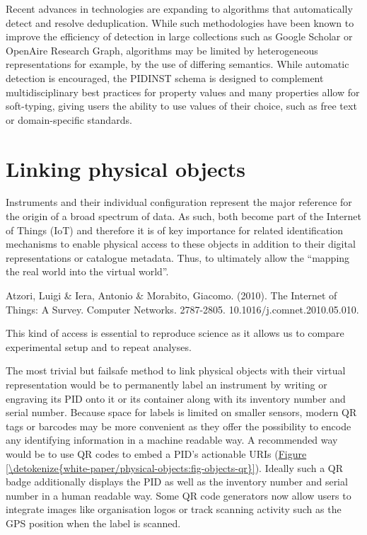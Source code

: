 \documentclass[a4paper,10pt,english]{sphinxmanual}
\begin{document}
Recent advances in technologies are expanding to algorithms that
automatically detect and resolve deduplication. While such methodologies
have been known to improve the efficiency of detection in large
collections such as Google Scholar or OpenAire Research Graph,
algorithms may be limited by heterogeneous representations for example,
by the use of differing semantics. While automatic detection is
encouraged, the PIDINST schema is designed to complement
multidisciplinary best practices for property values and many properties
allow for soft-typing, giving users the ability to use values of their
choice, such as free text or domain-specific standards.


\section{Linking physical objects}
\label{\detokenize{white-paper/physical-objects:linking-physical-objects}}\label{\detokenize{white-paper/physical-objects::doc}}
Instruments and their individual configuration represent the major
reference for the origin of a broad spectrum of data. As such, both
become part of the Internet of Things (IoT) and therefore it is of key
importance for related identification mechanisms to enable physical
access to these objects in addition to their digital representations or
catalogue metadata. Thus, to ultimately allow the “mapping the real
world into the virtual world”.%
\begin{footnote}[1]\sphinxAtStartFootnote
Atzori, Luigi \& Iera, Antonio \& Morabito, Giacomo. (2010). The
Internet of Things: A Survey. Computer Networks. 2787-2805.
10.1016/j.comnet.2010.05.010.
%
\end{footnote} This kind of access is
essential to reproduce science as it allows us to compare experimental
setup and to repeat analyses.

The most trivial but failsafe method to link physical objects with their
virtual representation would be to permanently label an instrument by
writing or engraving its PID onto it or its container along with its
inventory number and serial number. Because space for labels is limited
on smaller sensors, modern QR tags or barcodes may be more convenient as
they offer the possibility to encode any identifying information in a
machine readable way. A recommended way would be to use QR codes to
embed a PID’s actionable URIs (\hyperref[\detokenize{white-paper/physical-objects:fig-objects-qr}]{Figure \ref{\detokenize{white-paper/physical-objects:fig-objects-qr}}}). Ideally such
a QR badge additionally displays the PID as well as the inventory
number and serial number in a human readable way. Some QR code
generators now allow users to integrate images like organisation logos
or track scanning activity such as the GPS position when the label is
scanned.
\end{document}
